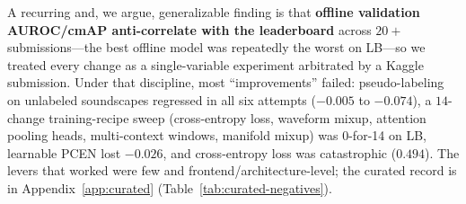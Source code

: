 A recurring and, we argue, generalizable finding is that \textbf{offline validation AUROC/cmAP
anti-correlate with the leaderboard} across $20{+}$ submissions---the best offline model was
repeatedly the worst on LB---so we treated every change as a single-variable experiment arbitrated
by a Kaggle submission.
Under that discipline, most ``improvements'' failed: pseudo-labeling on unlabeled soundscapes
regressed in all six attempts ($-0.005$ to $-0.074$), a $14$-change training-recipe sweep
(cross-entropy loss, waveform mixup, attention pooling heads, multi-context windows, manifold
mixup) was 0-for-14 on LB, learnable PCEN lost $-0.026$, and cross-entropy loss was catastrophic
($0.494$).
The levers that worked were few and frontend/architecture-level; the curated record is in
Appendix~\ref{app:curated} (Table~\ref{tab:curated-negatives}).
